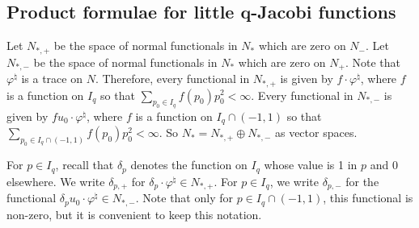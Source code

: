 \documentclass[pdftex]{sigma}
\numberwithin{equation}{section}
\theoremstyle{definition}
\begin{document}
\subsection*{Product formulae for little $\boldsymbol{q}$-Jacobi functions}

Let $N_{\ast, +}$ be the space of normal functionals in $N_\ast$ which are zero
on $N_-$. Let $N_{\ast, -}$ be the space of normal functionals in $N_\ast$ which
are zero on $N_+$. Note that $\varphi^\natural$ is a trace on $N$.
Therefore, every functional in $N_{\ast, +}$ is given by $f \cdot
\varphi^\natural$, where $f$ is a function on $I_q$ so that $\sum_{p_0 \in I_q} f(p_0) p_0^2 < \infty$.
Every
functional in $N_{\ast, -}$ is given by $f u_0 \cdot
\varphi^\natural$, where $f$ is a function on $I_q \cap (-1,1)$ so that $\sum_{p_0 \in I_q \cap (-1,1)} f(p_0) p_0^2 < \infty$.  So $N_\ast = N_{\ast, +} \oplus N_{\ast, -}$ as
vector spaces.

 For $p \in I_q$, recall that $\delta_p$ denotes the function on $I_q$ whose value is 1 in $p$ and 0
elsewhere. We write $\delta_{p,+}$ for   $\delta_p \cdot \varphi^\natural \in  N_{\ast,+}$. For
$p \in I_q $, we write $\delta_{p,-}$ for the
functional $\delta_p u_0 \cdot \varphi^\natural \in N_{\ast,-}$. Note that only for $p \in I_q \cap (-1,1)$, this functional is non-zero, but it is convenient to keep this notation.
\end{document}
